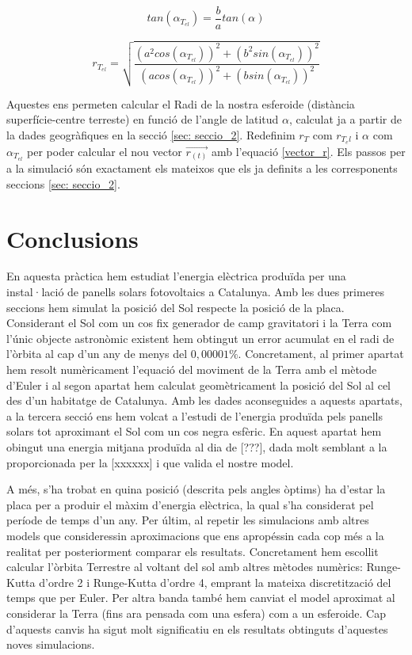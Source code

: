 \documentclass[11pt]{article}
\begin{document}
\begin{equation}
    tan(\alpha_{T_{el}}) = \frac{b}{a}tan(\alpha) 
    \label{eq: alphatel}
\end{equation}

\begin{equation}
    r_{T_{el}} = \sqrt{\frac{(a^2cos(\alpha_{T_{el}}))^2+(b^2sin(\alpha_{T_{el}}))^2}{(acos(\alpha_{T_{el}}))^2+(bsin(\alpha_{T_{el}}))^2}}
    \label{eq: rtel}
\end{equation}

Aquestes ens permeten calcular el Radi de la nostra esferoide (distància superfície-centre terreste) en funció de l'angle de latitud $\alpha$, calculat ja a partir de la dades geogràfiques en la secció \ref{sec: seccio_2}. Redefinim $r_T$ com $r_{T_el}$ i $\alpha$ com $\alpha_{T_{el}}$ per poder calcular el nou vector $\vec{r_{(t)}}$ amb l'equació \eqref{vector_r}. Els passos per a la simulació són exactament els mateixos que els ja definits a les corresponents seccions \ref{sec: seccio_2}.

\section{Conclusions}
En aquesta pràctica hem estudiat l'energia elèctrica produïda per una instal·lació de panells solars fotovoltaics a Catalunya. Amb les dues primeres seccions hem simulat la posició del Sol respecte la posició de la placa. Considerant el Sol com un cos fix generador de camp gravitatori i la Terra com l'únic objecte astronòmic existent hem obtingut un error acumulat en el radi de l'òrbita al cap d'un any de menys del $0,00001\%$. Concretament, al primer apartat hem resolt numèricament l'equació del moviment de la Terra amb el mètode d'Euler i al segon apartat hem calculat geomètricament la posició del Sol al cel des d'un habitatge de Catalunya. Amb les dades aconseguides a aquests apartats, a la tercera secció ens hem volcat a l'estudi de l'energia produïda pels panells solars tot aproximant el Sol com un cos negra esfèric. En aquest apartat hem obingut una energia mitjana produïda al dia de [???], dada molt semblant a la proporcionada per la [xxxxxx] i que valida el nostre model.

A més, s'ha trobat en quina posició (descrita pels angles òptims) ha d'estar la placa per a produir el màxim d'energia elèctrica, la qual s'ha considerat pel període de temps d'un any. Per últim, al repetir les simulacions amb altres models que consideressin aproximacions que ens apropéssin cada cop més a la realitat per posteriorment comparar els resultats. Concretament hem escollit calcular l'òrbita Terrestre al voltant del sol amb altres mètodes numèrics: Runge-Kutta d'ordre 2 i Runge-Kutta d'ordre 4, emprant la mateixa discretització del temps que per Euler. Per altra banda també hem canviat el model aproximat al considerar la Terra (fins ara pensada com una esfera) com a un esferoide. Cap d'aquests canvis ha sigut molt significatiu en els resultats obtinguts d'aquestes noves simulacions. 
\end{document}
